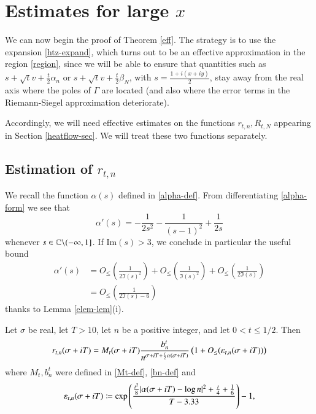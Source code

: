 \section{Estimates for large $x$}\label{initial-sec}

We can now begin the proof of Theorem \ref{eff}.  
The strategy is to use the expansion \eqref{htz-expand}, which turns out to be an effective approximation in the region \eqref{region}, since we will be able to ensure that quantities such as $s + \sqrt{t} v + \frac{t}{2} \alpha_n$ or $s + \sqrt{t} v + \frac{t}{2} \beta_N$, with $s = \frac{1+i(x+iy)}{2}$, stay away from the real axis where the poles of $\Gamma$ are located (and also where the error terms in the Riemann-Siegel approximation deteriorate).  

Accordingly, we will need effective estimates on the functions $r_{t,n}, R_{t,N}$ appearing in Section \ref{heatflow-sec}.  We will treat these two functions separately.

\subsection{Estimation of $r_{t,n}$}

We recall the function $\alpha(s)$ defined in \eqref{alpha-def}.  From differentiating \eqref{alpha-form} we see that
\begin{equation}\label{alpha-deriv}
 \alpha'(s) = -\frac{1}{2s^2} - \frac{1}{(s-1)^2} + \frac{1}{2 s}
\end{equation}
whenever $s \in \mathbb{C} \backslash (-\infty,1]$.  If $\mathrm{Im}(s) > 3$, we conclude in particular the useful bound
\begin{equation}\label{alpha-deriv-bound}
\begin{split}
 \alpha'(s) &= O_{\leq}\left( \frac{1}{2\Im(s)^2} \right) + O_{\leq}\left( \frac{1}{\Im(s)^2} \right) + O_{\leq}\left( \frac{1}{2\Im(s)} \right) \\
 &= O_{\leq}\left( \frac{1}{2 \Im(s)-6} \right)
\end{split}
\end{equation}
thanks to Lemma \ref{elem-lem}(i).  


\begin{proposition}\label{rtn-prop}  Let $\sigma$ be real, let $T>10$, let $n$ be a positive integer, and let $0 < t \leq 1/2$.  Then 
$$ r_{t,n}(\sigma+iT) = M_t(\sigma+iT) \frac{b_n^t}{n^{\sigma+iT+\frac{t}{2} \alpha(\sigma+iT)}} \left(1 + O_{\leq}(\varepsilon_{t,n}(\sigma+iT))\right)$$
where $M_t, b_n^t$ were defined in \eqref{Mt-def}, \eqref{bn-def} and
\begin{equation}\label{eps-def}
 \varepsilon_{t,n}(\sigma+iT) \coloneqq \exp\left( \frac{\frac{t^2}{8} |\alpha(\sigma+iT) - \log n|^2 + \frac{t}{4} + \frac{1}{6}}{T-3.33} \right)-1,
\end{equation}
\end{proposition}

